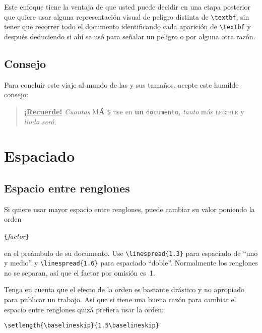 Este enfoque tiene la ventaja de que usted puede decidir en una etapa posterior que quiere usar alguna representación visual de peligro distinta de \verb|\textbf|, sin tener que recorrer todo el documento identificando cada aparición de \verb|\textbf| y después deduciendo si ahí se usó para señalar un peligro o por alguna otra razón.


\subsection{Consejo}

Para concluir este viaje al mundo de las \fontsnomo{} y sus tamaños, acepte este humilde consejo:\nopagebreak

\begin{quote}
  \underline{\textbf{{\Huge¡}Recuerde\Huge!}} \textit{Cuantas}
  \textsf{M\textbf{\LARGE Á} \texttt{S}} \textsl{\fontsnomo{}} \Huge use
  \tiny en \footnotesize \textbf{un}  \small \texttt{documento},
  \large \textit{tanto} \normalsize más \textsc{legible} y
  \textsl{\textsf{lindo} \large s\Large e\LARGE r\huge á}.
\end{quote}

\section{Espaciado}
 
\subsection{Espacio entre renglones}

 Si quiere usar mayor espacio entre renglones, puede cambiar su valor poniendo la orden
\begin{lscommand}
\verb|{|\emph{factor}\verb|}|
\end{lscommand}
en el preámbulo de su documento. Use \verb|\linespread{1.3}| para espaciado de ``uno y medio'' y \verb|\linespread{1.6}| para espaciado ``doble''.  Normalmente los renglones no se separan, así que el factor por omisión es~1.

Tenga en cuenta que el efecto de la orden  es bastante drástico y no apropiado para publicar un trabajo.  Así que si tiene una buena razón para cambiar el espacio entre renglones quizá prefiera usar la orden:
\begin{lscommand}
\verb|\setlength{\baselineskip}{1.5\baselineskip}|
\end{lscommand}

